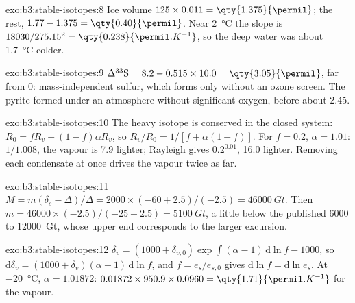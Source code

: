 \begin{solution}{exo:b3:stable-isotopes:8}
Ice volume $125\times0.011 = \qty{1.375}{\permil}$; the rest, $1.77 - 1.375 =
\qty{0.40}{\permil}$. Near \qty{2}{\celsius} the slope is $18030/275.15^2 =
\qty{0.238}{\permil.K^{-1}}$, so the deep water was about \qty{1.7}{\celsius}
colder.
\end{solution}

\begin{solution}{exo:b3:stable-isotopes:9}
$\Delta^{33}\mathrm S = 8.2 - 0.515\times10.0 = \qty{3.05}{\permil}$, far from 0:
mass-independent sulfur, which forms only without an ozone screen. The pyrite
formed under an atmosphere without significant oxygen, before about
\qty{2.45}{\Ga}.
\end{solution}

\begin{solution}{exo:b3:stable-isotopes:10}
The heavy isotope is conserved in the closed system: $R_0 = fR_v + (1 -
f)\alpha R_v$, so $R_v/R_0 = 1/[f + \alpha(1 - f)]$. For $f = 0.2$, $\alpha =
1.01$: $1/1.008$, the vapour is \qty{7.9}{\permil} lighter; Rayleigh gives
$0.2^{0.01}$, \qty{16.0}{\permil} lighter. Removing each condensate at once
drives the vapour twice as far.
\end{solution}

\begin{solution}{exo:b3:stable-isotopes:11}
$M = m(\delta_s - \Delta)/\Delta = 2000\times(-60 + 2.5)/(-2.5) = \qty{46000}{Gt}$.
Then $m = 46000\times(-2.5)/(-25 + 2.5) = \qty{5100}{Gt}$, a little below the
published 6000 to \qty{12000}{Gt}, whose upper end corresponds to the larger
excursion.
\end{solution}

\begin{solution}{exo:b3:stable-isotopes:12}
$\delta_v = (1000 + \delta_{v,0})\exp\int(\alpha - 1)\,\mathrm d\ln f - 1000$, so
$\mathrm d\delta_v = (1000 + \delta_v)(\alpha - 1)\,\mathrm d\ln f$, and $f =
e_s/e_{s,0}$ gives $\mathrm d\ln f = \mathrm d\ln e_s$. At \qty{-20}{\celsius},
$\alpha = 1.01872$: $0.01872\times950.9\times0.0960 =
\qty{1.71}{\permil.K^{-1}}$ for the vapour.
\end{solution}

